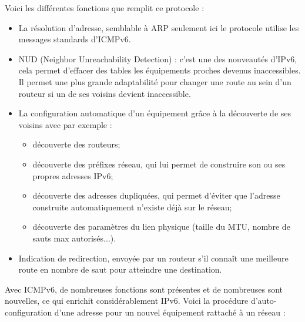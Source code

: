 Voici les différentes fonctions que remplit ce protocole :
\begin{itemize}
  \item La résolution d’adresse, semblable à ARP seulement ici le protocole utilise les messages standards d’ICMPv6.
  \item NUD (Neighbor Unreachability Detection) : c’est une des nouveautés d’IPv6, cela permet d’effacer des tables les équipements proches devenus inaccessibles. Il permet une plus grande adaptabilité pour changer une route au sein d’un routeur si un de ses voisins devient inaccessible.
  \item La configuration automatique d’un équipement grâce à la découverte de ses voisins avec par exemple :
    \begin{itemize}
      \item découverte des routeurs;
      \item découverte des préfixes réseau, qui lui permet de construire son ou ses propres adresses IPv6;
      \item découverte des adresses dupliquées, qui permet d’éviter que l’adresse construite automatiquement n’existe déjà sur le réseau;
      \item découverte des paramètres du lien physique (taille du MTU, nombre de sauts max autorisés...).
    \end{itemize}
  \item	Indication de redirection, envoyée par un routeur s’il connaît une meilleure route en nombre de saut pour atteindre une destination.
\end{itemize}Avec ICMPv6, de nombreuses fonctions sont présentes et de nombreuses sont nouvelles, ce qui enrichit considérablement IPv6.
\newpage
Voici la procédure d’auto-configuration d’une adresse pour un nouvel équipement rattaché à un réseau :
